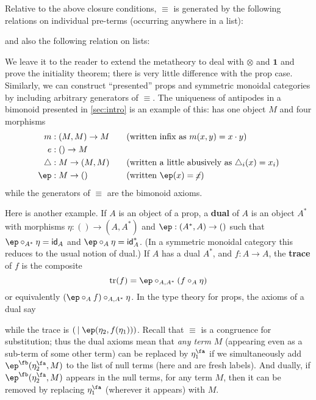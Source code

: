 \documentclass{book}
\def\tr{\mathrm{tr}}
\def\idfunc{\mathsf{id}}
\let\types\vdash
\def\unit{\mathbf{1}}
\def\ttt{\mathsf{tt}}
\def\pair#1#2{\langle #1,#2\rangle}
\let\tensor\otimes
\begin{document}
Relative to the above closure conditions, $\equiv$ is generated by the following relations on individual pre-terms (occurring anywhere in a list):
and also the following relation on lists:

We leave it to the reader to extend the metatheory to deal with $\tensor$ and $\unit$ and prove the initiality theorem; there is very little difference with the prop case.
Similarly, we can construct ``presented'' props and symmetric monoidal categories by including arbitrary generators of $\equiv$.
The uniqueness of antipodes in a bimonoid presented in \cref{sec:intro} is an example of this: \cG has one object $M$ and four morphisms
\begin{alignat*}{2}
m&:(M,M)\to M &&\quad\text{(written infix as $m(x,y) = x\cdot y$)}\\
e&:()\to M\\
\triangle&:M\to (M,M) &&\quad\text{(written a little abusively as $\triangle_i(x) = x_i$)}\\
\ep &:M\to () &&\quad\text{(written $\ep(x) = \cancel{x}$)}
\end{alignat*}
while the generators of $\equiv$ are the bimonoid axioms.

Here is another example.
If $A$ is an object of a prop, a \textbf{dual} of $A$ is an object $A^*$ with morphisms $\eta:()\to (A,A^*)$ and $\ep:(A^*,A)\to ()$ such that $\ep \circ_{A^*} \eta = \idfunc_A$ and $\ep \circ_{A} \eta = \idfunc_A^*$.
(In a symmetric monoidal category this reduces to the usual notion of dual.)
If $A$ has a dual $A^*$, and $f:A\to A$, the \textbf{trace} of $f$ is the composite 
\[ \tr(f) = \ep \circ_{A,A^*} (f \circ_A \eta) \]
or equivalently $(\ep \circ_A f)\circ_{A,A^*} \eta$.
In the type theory for props, the axioms of a dual say
while the trace is $(\,\mid \ep(\eta_2,f(\eta_1)))$.
Recall that $\equiv$ is a congruence for substitution; thus the dual axioms mean that \emph{any term} $M$ (appearing even as a sub-term of some other term) can be replaced by $\eta_1^\fa$ if we simultaneously add $\ep^\fb(\eta_2^\fa,M)$ to the list of null terms (here \fa and \fb are fresh labels).
And dually, if $\ep^\fb(\eta_2^\fa,M)$ appears in the null terms, for any term $M$, then it can be removed by replacing $\eta_1^\fa$ (wherever it appears) with $M$.
\end{document}
